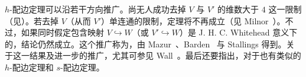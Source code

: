 $h$-配边定理可以沿若干方向推广。尚无人成功去掉 $V$ 与 $V'$ 的维数大于 $4$ 这一限制（见）。若去掉 $V$（从而 $V'$）单连通的限制，定理将不再成立（见 Milnor~\cite{ref34}）。不过，如果同时假定包含映射 $V\hookrightarrow W$（或 $V'\hookrightarrow W$）是 J. H. C. Whitehead 意义下的，结论仍然成立。这个推广称为，由 Mazur~\cite{ref35}、Barden~\cite{ref33} 与 Stallings 得到。关于这一结果及进一步的推广，尤其可参见 Wall~\cite{ref36}。最后还要指出，对于也有类似的 $h$-配边定理和 $s$-配边定理。
